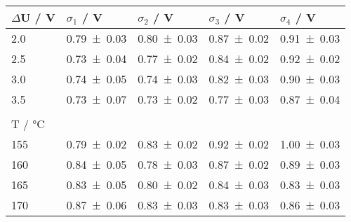 \begin{tabular}{lllll}
\toprule
$\Delta$U / \si{\volt} & $\sigma_1$ / \si{\volt} & $\sigma_2$ / \si{\volt} & $\sigma_3$ / \si{\volt} & $\sigma_4$ / \si{\volt} \\
\midrule
\num{2,0}	& \num{0.79+-0.03} &	\num{0.80+-0.03} &	\num{0.87+-0.02} &	\num{0.91+-0.03}	\\
\num{2.5}	& \num{0.73+-0.04} &	\num{0.77+-0.02} &	\num{0.84+-0.02} &	\num{0.92+-0.02}	\\
\num{3,0}	& \num{0.74+-0.05} &	\num{0.74+-0.03} &	\num{0.82+-0.03} &	\num{0.90+-0.03}	\\
\num{3.5}	& \num{0.73+-0.07} &	\num{0.73+-0.02} &	\num{0.77+-0.03} &	\num{0.87+-0.04}	\\
	      &					  &			  	 	  &					  &			\\
T / \si{\degreeCelsius} & & & & \\
\midrule
\num{155}	& \num{0.79+-0.02} &	\num{0.83+-0.02} &	\num{0.92+-0.02} &	\num{1.00+-0.03}	\\
\num{160}	& \num{0.84+-0.05} &	\num{0.78+-0.03} &	\num{0.87+-0.02} &	\num{0.89+-0.03}	\\
\num{165}	& \num{0.83+-0.05} &	\num{0.80+-0.02} &	\num{0.84+-0.03} &	\num{0.83+-0.03}	\\
\num{170}	& \num{0.87+-0.06} &	\num{0.83+-0.03} &	\num{0.83+-0.03} &	\num{0.86+-0.03} 	\\
\bottomrule
\end{tabular}